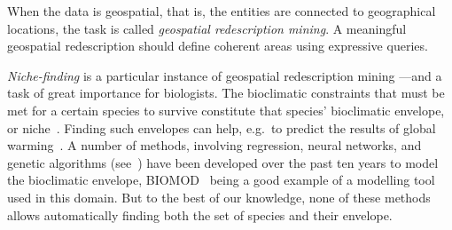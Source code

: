 When the data is geospatial, that is, the entities are connected to
geographical locations, the task is called \emph{geospatial redescription mining}.
 A meaningful geospatial redescription should define
coherent areas using expressive queries.

\emph{Niche-finding} is a particular instance of geospatial redescription
mining ---and a task of great importance for biologists.  The
bioclimatic constraints that must be met for a certain species to
survive constitute that species' bioclimatic envelope, or
niche~\cite{grinnell17niche}.  Finding such envelopes can help, e.g.\
to predict the results of global warming~\cite{pearson03predicting}.
A number of methods, involving regression, neural networks, and
genetic algorithms (see~\cite{soberon05interpretation}) have been
developed over the past ten years to model the bioclimatic envelope,
\textsc{BIOMOD}~\cite{thuiller09biomod} being a good example of a
modelling tool used in this domain.  But to the best of our knowledge,
none of these methods allows automatically finding both the set of
species and their envelope.

